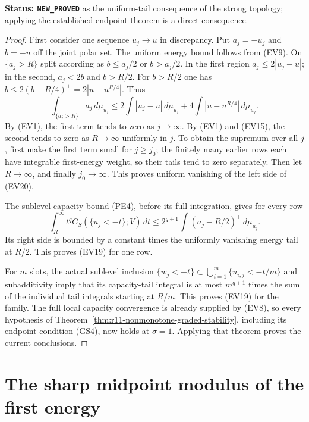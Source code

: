 \documentclass[11pt,a4paper]{article}
\numberwithin{equation}{section}
\theoremstyle{definition}
\theoremstyle{remark}
\begin{document}
\noindent\textbf{Status: \texttt{NEW\_PROVED}} as the
uniform-tail consequence of the strong topology; applying
the established endpoint theorem is a direct consequence.

\begin{proof}
First consider one sequence $u_j\to u$ in discrepancy.
Put $a_j=-u_j$ and $b=-u$ off the joint polar set.
The uniform energy bound follows from (EV9). On
$\{a_j>R\}$ split according as $b\leq a_j/2$ or
$b>a_j/2$. In the first region $a_j\leq2|u_j-u|$;
in the second, $a_j<2b$ and $b>R/2$.
For $b>R/2$ one has
$b\leq2(b-R/4)^+=2|u-u^{R/4}|$.
Thus
\[
 \int_{\{a_j>R\}}a_j\,d\mu_{u_j}
    \leq2\int|u_j-u|\,d\mu_{u_j}
             +4\int|u-u^{R/4}|\,d\mu_{u_j}.
 \tag{EV20}
\]
By (EV1), the first term tends to zero as $j\to\infty$.
By (EV1) and (EV15), the second tends to zero as
$R\to\infty$ uniformly in $j$. To obtain the supremum
over all $j$, first make the first term small for
$j\geq j_0$; the finitely many earlier rows each have
integrable first-energy weight, so their tails tend
to zero separately. Then let $R\to\infty$, and finally
$j_0\to\infty$. This proves uniform vanishing of the
left side of (EV20).

The sublevel capacity bound (PE4), before its full
integration, gives for every row
\[
 \int_R^\infty t^q C_S(\{u_j<-t\};V)\,dt
       \leq2^{q+1}\int(a_j-R/2)^+\,d\mu_{u_j}.
 \tag{EV21}
\]
Its right side is bounded by a constant times the
uniformly vanishing energy tail at $R/2$.
This proves (EV19) for one row.

For $m$ slots, the actual sublevel inclusion
$\{w_j<-t\}\subset\bigcup_{i=1}^m\{u_{i,j}<-t/m\}$
and subadditivity imply that its capacity-tail integral
is at most $m^{q+1}$ times the sum of the individual
tail integrals starting at $R/m$. This proves (EV19)
for the family. The full local capacity convergence is
already supplied by (EV8), so every hypothesis of
Theorem~\ref{thm:r11-nonmonotone-graded-stability}, including
its endpoint condition (GS4), now holds at $\sigma=1$.
Applying that theorem proves the current conclusions.
\end{proof}



\section{The sharp midpoint modulus of the first energy}
\label{sec:r11-sharp-midpoint-modulus}
\end{document}
